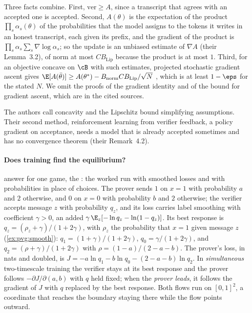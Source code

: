 \begin{refsection}
\begin{proofsketch}
Three facts combine. First, $\mathrm{ver}\ge A$, since a transcript that agrees with an accepted one is accepted. Second, $A(\theta)$ is the expectation of the product $\prod_s\alpha_s(\theta)$ of the probabilities that the model assigns to the tokens it writes in an honest transcript, each given its prefix, and the gradient of the product is $\prod_s\alpha_s\sum_s\nabla\log\alpha_s$; so the update is an unbiased estimate of $\nabla A$ (their Lemma~3.2), of norm at most $CB_{\mathrm{Lip}}$ because the product is at most $1$. Third, for an objective concave on $\cB$ with such estimates, projected stochastic gradient ascent gives $\E[A(\bar\theta)]\ge A(\theta^*)-B_{\mathrm{norm}}CB_{\mathrm{Lip}}/\sqrt N$ \parencite[Chapter~14]{ShalevShwartzBenDavid2014}, which is at least $1-\eps$ for the stated $N$. We omit the proofs of the gradient identity and of the bound for gradient ascent, which are in the cited sources.
\end{proofsketch}

The authors call concavity and the Lipschitz bound simplifying assumptions. Their second method, reinforcement learning from verifier feedback, a policy gradient on acceptance, needs a model that is already accepted sometimes and has no convergence theorem (their Remark~4.2).

\paragraph{Does training find the equilibrium?} \Textcite{AnilEtAl2021} answer for one game, the : the worked run with smoothed losses and with probabilities in place of choices. The prover sends $1$ on $x=1$ with probability $a$ and $2$ otherwise, and $0$ on $x=0$ with probability $b$ and $2$ otherwise; the verifier accepts message $z$ with probability $q_z$, and its loss carries label smoothing with coefficient $\gamma>0$, an added $\gamma\,\E_z[-\ln q_z-\ln(1-q_z)]$. Its best response is $q_z=(\rho_z+\gamma)/(1+2\gamma)$, with $\rho_z$ the probability that $x=1$ given message $z$ (\cref{ex:pvg:smooth}): $q_1=(1+\gamma)/(1+2\gamma)$, $q_0=\gamma/(1+2\gamma)$, and $q_2=(\rho+\gamma)/(1+2\gamma)$ with $\rho=(1-a)/(2-a-b)$. The prover's loss, in nats and doubled, is $J=-a\ln q_1-b\ln q_0-(2-a-b)\ln q_2$. In \emph{simultaneous} two-timescale training the verifier stays at its best response and the prover follows $-\partial J/\partial(a,b)$ with $q$ held fixed; when the \emph{prover leads}, it follows the gradient of $J$ with $q$ replaced by the best response. Both flows run on $[0,1]^2$, a coordinate that reaches the boundary staying there while the flow points outward.


\end{refsection}
